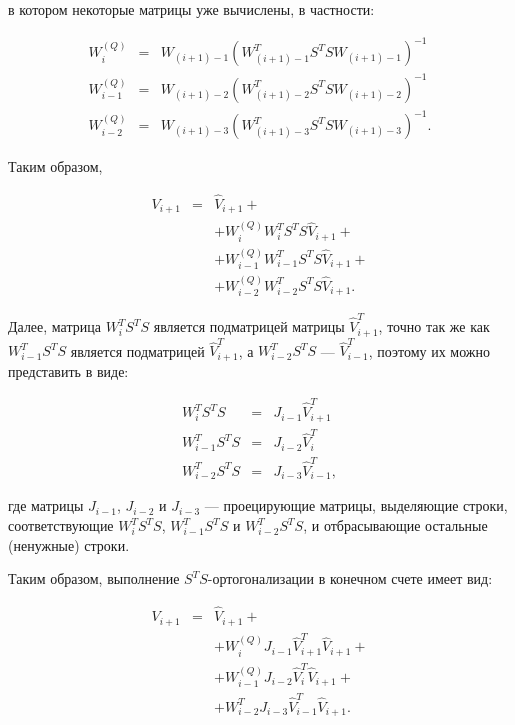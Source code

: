 в котором некоторые матрицы уже вычислены, в частности:

$$
	\begin{array}{lll}
		W_i^{(Q)}     & = & W_{(i+1)-1} \left ( W_{(i+1)-1}^T S^T S W_{(i+1)-1} \right ) ^{-1} \\
		W_{i-1}^{(Q)} & = & W_{(i+1)-2} \left ( W_{(i+1)-2}^T S^T S W_{(i+1)-2} \right ) ^{-1} \\
		W_{i-2}^{(Q)} & = & W_{(i+1)-3} \left ( W_{(i+1)-3}^T S^T S W_{(i+1)-3} \right ) ^{-1} .
	\end{array}
$$

Таким образом,

$$
	\begin{array}{ccl}
		V_{i+1} & = & \widehat{V}_{i+1} + \\
	        &   & + W_i^{(Q)}     W_{i}^T   S^T S \widehat{V}_{i+1} + \\
	        &   & + W_{i-1}^{(Q)} W_{i-1}^T S^T S \widehat{V}_{i+1} + \\
	        &   & + W_{i-2}^{(Q)} W_{i-2}^T S^T S \widehat{V}_{i+1} .
	\end{array}
$$

Далее, матрица $W_{i}^T S^T S$ является подматрицей матрицы $\widehat{V}_{i+1}^T$, точно так же как $W_{i-1}^T S^T S$ является подматрицей $\widehat{V}_{i+1}^T$,
а $W_{i-2}^T S^T S$ --- $\widehat{V}_{i-1}^T$, поэтому их можно представить в виде:

$$
	\begin{array}{ccl}
		W_{i}^T S^T S   & = & J_{i-1} \widehat{V}_{i+1}^T \\
		W_{i-1}^T S^T S & = & J_{i-2} \widehat{V}_{i}^T \\
		W_{i-2}^T S^T S & = & J_{i-3} \widehat{V}_{i-1}^T ,
	\end{array}
$$

где матрицы $J_{i-1}$, $J_{i-2}$ и $J_{i-3}$ --- проецирующие матрицы, выделяющие строки, соответствующие $W_{i}^T S^T S$, $W_{i-1}^T S^T S$ и $W_{i-2}^T S^T S$,
и отбрасывающие остальные (ненужные) строки.

Таким образом, выполнение $S^T S$-ортогонализации в конечном счете имеет вид:

$$
	\begin{array}{ccl}
		V_{i+1} & = & \widehat{V}_{i+1} + \\
	        &   & + W_i^{(Q)}     J_{i-1} \widehat{V}_{i+1}^T \widehat{V}_{i+1} + \\
	        &   & + W_{i-1}^{(Q)} J_{i-2} \widehat{V}_{i}^T   \widehat{V}_{i+1} + \\
	        &   & + W_{i-2}^T     J_{i-3} \widehat{V}_{i-1}^T \widehat{V}_{i+1} .
	\end{array}
$$

